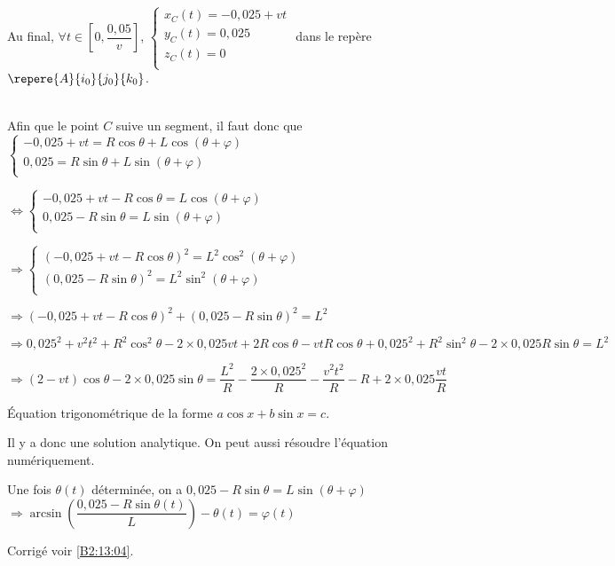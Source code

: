 Au final, $\forall t \in \left[0,\dfrac{0,05}{v}\right]$, $\left\{
\begin{array}{l}
x_C(t)= -0,025+vt\\
y_C(t)= 0,025\\
z_C(t)= 0\\
\end{array}
\right.
$ dans le repère $\repere{A}{i_0}{j_0}{k_0}$.


\else
\fi

\ifprof ~\\
Afin que le point $C$ suive un segment, il faut donc que 
$\left\{
\begin{array}{l}
-0,025+vt= R\cos\theta  +L\cos\left(\theta+\varphi\right)  \\
0,025 = R \sin\theta + L\sin\left(\theta+\varphi\right)\\
\end{array}
\right.
$

$\Leftrightarrow 
\left\{
\begin{array}{l}
-0,025+vt- R\cos\theta  =L\cos\left(\theta+\varphi\right)  \\
0,025 - R \sin\theta  = L\sin\left(\theta+\varphi\right)\\
\end{array}
\right.
$

$\Rightarrow 
\left\{
\begin{array}{l}
\left(-0,025+vt- R\cos\theta\right)^2  =L^2\cos^2\left(\theta+\varphi\right)  \\
\left(0,025 - R \sin\theta  \right)^2= L^2\sin^2\left(\theta+\varphi\right)\\
\end{array}
\right.
$

$\Rightarrow 
\left(-0,025+vt- R\cos\theta\right)^2  + \left(0,025 - R \sin\theta  \right)^2 = L^2
$

$\Rightarrow 
0,025^2+v^2t^2+R^2\cos^2\theta -2\times 0,025 vt+2R\cos\theta-vtR\cos\theta
  + 0,025^2 + R^2 \sin^2\theta -2\times 0,025 R \sin\theta  =      L^2
$

$\Rightarrow 
\left(2-vt\right)\cos\theta  -2\times 0,025  \sin\theta  =      \dfrac{L^2}{R} - \dfrac{2\times0,025^2}{R}-\dfrac{v^2t^2}{R}-R +2\times 0,025 \dfrac{vt}{R}
$


Équation trigonométrique de la forme $a\cos x  + b\sin x =c$.

Il y a donc une solution analytique. On peut aussi résoudre l'équation numériquement.


Une fois $\theta(t)$ déterminée, on a $0,025 - R \sin\theta  = L\sin\left(\theta+\varphi\right)$ 
$\Rightarrow \arcsin\left(\dfrac{0,025 - R \sin\theta(t)}{L}\right)  - \theta(t) = \varphi(t)$

\else
\fi


\ifprof
\else
\fi


\ifprof
\else
\begin{flushright}
\footnotesize{Corrigé  voir \ref{B2:13:04}.}
\end{flushright}%
\fi